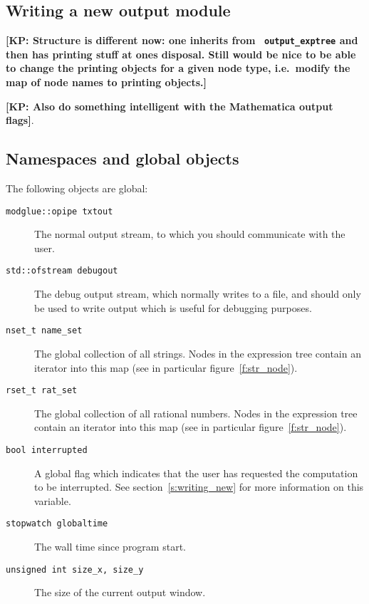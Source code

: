\documentclass[11pt]{article}
\newcommand{\kcomment}[2]{{\bf [#1: #2]}}
\numberwithin{equation}{section}
\begin{document}
\subsection{Writing a new output module}


\kcomment{KP}{Structure is different now: one inherits from {\tt
output\_exptree} and then has printing stuff at ones disposal. Still
would be nice to be able to change the printing objects for a given
node type, i.e.~modify the map of node names to printing objects.}

\kcomment{KP}{Also do something intelligent with the Mathematica
output flags}.


\subsection{Namespaces and global objects}

The following objects are global:
\begin{description}
\item[{\tt modglue::opipe txtout}] 
The normal output stream, to which you should communicate with the user.
\item[{\tt std::ofstream debugout}]
The debug output stream, which normally writes to a file, and should
only be used to write output which is useful for debugging purposes.
\item[{\tt nset\_t name\_set}]
The global collection of all strings. Nodes in the expression tree
contain an iterator into this map (see in particular figure~\ref{f:str_node}).
\item[{\tt rset\_t rat\_set}]
The global collection of all rational numbers. Nodes in the expression
tree contain an iterator into this map (see in particular figure~\ref{f:str_node}).
\item[{\tt bool interrupted}]
A global flag which indicates that the user has requested the
computation to be interrupted. See section~\ref{s:writing_new} for
more information on this variable.
\item[{\tt stopwatch globaltime}]
The wall time since program start.
\item[{\tt unsigned int size\_x, size\_y}] The size of the current
  output window.
\end{description}

% 
\vfill\eject
\end{document}
